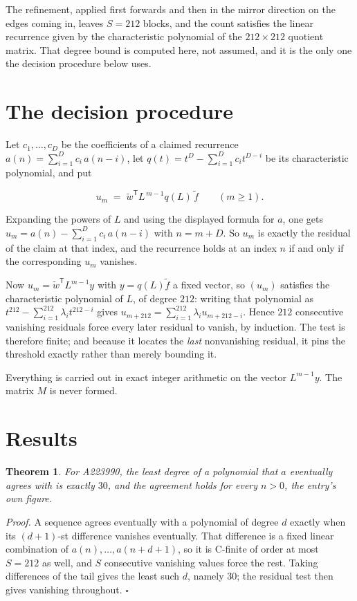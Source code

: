 \documentclass[11pt]{article}
\newtheorem{theorem}{Theorem}
\theoremstyle{definition}
\begin{document}
The refinement, applied first forwards and then in the mirror direction on the edges coming in, leaves $S = 212$ blocks, and the count satisfies the linear recurrence given by the characteristic polynomial of the $212 \times 212$ quotient matrix. That degree bound is computed here, not assumed, and it is the only one the decision procedure below uses.

\section{The decision procedure}

Let $c_1,\dots,c_D$ be the coefficients of a claimed recurrence $a(n) = \sum_{i=1}^{D} c_i\,a(n-i)$, let $q(t) = t^{D} - \sum_{i=1}^{D} c_i t^{D-i}$ be its characteristic polynomial, and put

\[u_m \;=\; \tilde w^{\mathsf T} L^{\,m-1} q(L)\,\tilde f \qquad (m \ge 1).\]

Expanding the powers of $L$ and using the displayed formula for $a$, one gets $u_m = a(n) - \sum_{i=1}^{D} c_i\,a(n-i)$ with $n = m + D$. So $u_m$ is exactly the residual of the claim at that index, and the recurrence holds at an index $n$ if and only if the corresponding $u_m$ vanishes.

Now $u_m = \tilde w^{\mathsf T} L^{m-1} y$ with $y = q(L)\tilde f$ a fixed vector, so $(u_m)$ satisfies the characteristic polynomial of $L$, of degree $212$: writing that polynomial as $t^{212} - \sum_{i=1}^{212} \lambda_i t^{212-i}$ gives $u_{m+212} = \sum_{i=1}^{212} \lambda_i u_{m+212-i}$. Hence $212$ consecutive vanishing residuals force every later residual to vanish, by induction. The test is therefore finite; and because it locates the {\itshape last} nonvanishing residual, it pins the threshold exactly rather than merely bounding it.

Everything is carried out in exact integer arithmetic on the vector $L^{m-1}y$. The matrix $M$ is never formed.

\section{Results}

\begin{theorem} For A223990, the least degree of a polynomial that $a$ eventually agrees with is exactly $30$, and the agreement holds for every $n > 0$, the entry's own figure.\end{theorem}

{\itshape Proof.} A sequence agrees eventually with a polynomial of degree $d$ exactly when its $(d+1)$-st difference vanishes eventually. That difference is a fixed linear combination of $a(n),\dots,a(n+d+1)$, so it is C-finite of order at most $S = 212$ as well, and $S$ consecutive vanishing values force the rest. Taking differences of the tail gives the least such $d$, namely $30$; the residual test then gives vanishing throughout. $\square$
\end{document}
